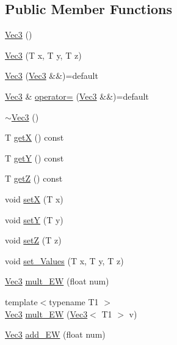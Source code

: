 \subsection*{Public Member Functions}
\begin{DoxyCompactItemize}
\item 
\mbox{\hyperlink{class_vec3_a7c150f37ecfa78ced8b83bd95908cc33}{Vec3}} ()
\item 
\mbox{\hyperlink{class_vec3_addc6700c00ab4cf8b6e872e5fab59020}{Vec3}} (T x, T y, T z)
\item 
\mbox{\hyperlink{class_vec3_acd2c273ce3703fd2a00ba8ed9e0cdaf7}{Vec3}} (\mbox{\hyperlink{class_vec3}{Vec3}} \&\&)=default
\item 
\mbox{\hyperlink{class_vec3}{Vec3}} \& \mbox{\hyperlink{class_vec3_a09d0d4c326c3a4c10a0917f6071382bb}{operator=}} (\mbox{\hyperlink{class_vec3}{Vec3}} \&\&)=default
\item 
\mbox{\hyperlink{class_vec3_a9283d297ddf47fb465cd95645615582a}{$\sim$\+Vec3}} ()
\item 
T \mbox{\hyperlink{class_vec3_ad259e243f6678730d990acbae2cdff57}{getX}} () const
\item 
T \mbox{\hyperlink{class_vec3_a8eeb16262b7e619f081a1ba94df098f8}{getY}} () const
\item 
T \mbox{\hyperlink{class_vec3_a52f0db1c387aa9bc7befe5792b698553}{getZ}} () const
\item 
void \mbox{\hyperlink{class_vec3_a2d66e34e1ad4be888821158541fcd2ea}{setX}} (T x)
\item 
void \mbox{\hyperlink{class_vec3_a4dadb34f7d48268a101914b7a4771e68}{setY}} (T y)
\item 
void \mbox{\hyperlink{class_vec3_a334f510fc72e3ae8cf50f61429db307a}{setZ}} (T z)
\item 
void \mbox{\hyperlink{class_vec3_ae581dad3aa1a885da7538582a3324d3a}{set\+\_\+\+Values}} (T x, T y, T z)
\item 
\mbox{\hyperlink{class_vec3}{Vec3}} \mbox{\hyperlink{class_vec3_a987916221fa68ba597397f51d5cf51b0}{mult\+\_\+\+EW}} (float num)
\item 
{\footnotesize template$<$typename T1 $>$ }\\\mbox{\hyperlink{class_vec3}{Vec3}} \mbox{\hyperlink{class_vec3_a3c49d6ccaf343f2182f5d8e5eb39df2c}{mult\+\_\+\+EW}} (\mbox{\hyperlink{class_vec3}{Vec3}}$<$ T1 $>$ v)
\item 
\mbox{\hyperlink{class_vec3}{Vec3}} \mbox{\hyperlink{class_vec3_ad31cbfb14b0da511f6692d5f0cb24808}{add\+\_\+\+EW}} (float num)
\item 

\end{DoxyCompactItemize}
